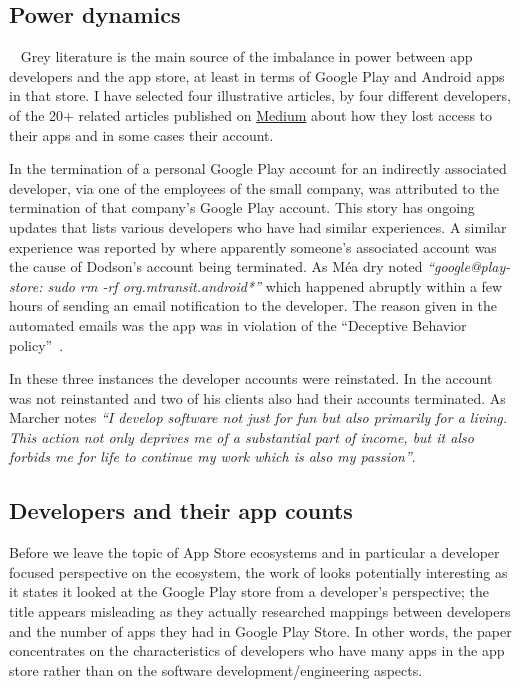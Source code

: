 \subsection{Power dynamics}~\label{rw-power-dynamics-topic}
Grey literature is the main source of the imbalance in power between app developers and the app store, at least in terms of Google Play and Android apps in that store. I have selected four illustrative articles, by four different developers, of the 20+ related articles published on \href{https://medium.com/}{Medium} %
about how they lost access to their apps and in some cases their account. 

In \textcite{martinez2019_google_just_terminated_our_startup_google_play_publisher_account_on_xmas_day} the termination of a personal Google Play account for an indirectly associated developer, via one of the employees of the small company, was attributed to the termination of that company's Google Play account. This story has ongoing updates that lists various developers who have had similar experiences. A similar experience was reported by \textcite{dodson2019_google_completely_terminated_our_new_business_etc} where apparently someone's associated account was the cause of Dodson's account being terminated. As Méa dry noted \emph{``google@play-store: sudo rm -rf org.mtransit.android*''} which happened abruptly within a few hours of sending an email notification to the developer. The reason given in the automated emails was the app was in violation of the ``Deceptive Behavior policy''~. 

In these three instances the developer accounts were reinstated. In \textcite{marcher2021_how_google_terminated-a-developer} the account was not reinstanted and two of his clients also had their accounts terminated. As Marcher notes \emph{``I develop software not just for fun but also primarily for a living. This action not only deprives me of a substantial part of income, but it also forbids me for life to continue my work which is also my passion''}. %

\subsection{Developers and their app counts}
Before we leave the topic of App Store ecosystems and in particular a developer focused perspective on the ecosystem, the work of \textcite{wang2017_exploratory_study_of_the_mobile_app_ecosystem} looks potentially interesting as it states it looked at the Google Play store from a developer's perspective; the title appears misleading as they actually researched mappings between developers and the number of apps they had in Google Play Store. In other words, the paper concentrates on the characteristics of developers who have many apps in the app store rather than on the software development/engineering aspects.


